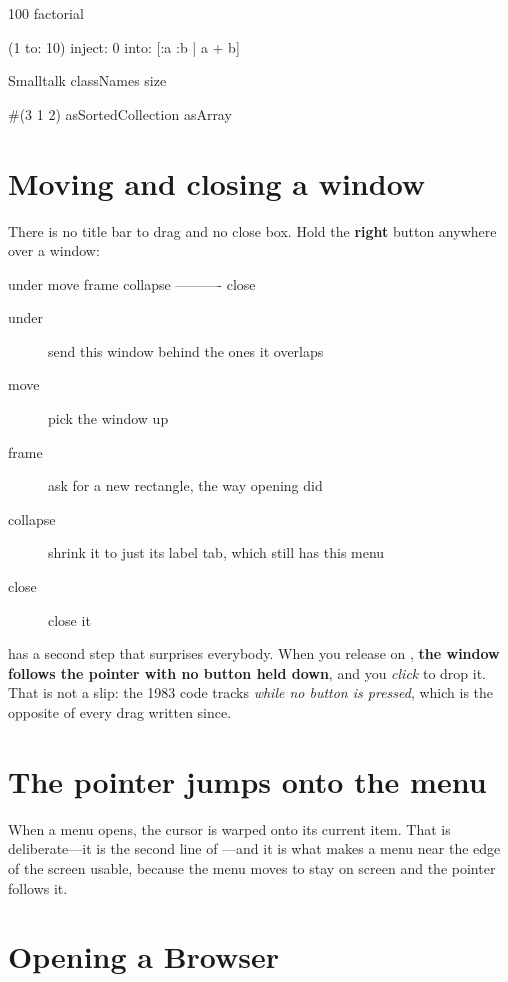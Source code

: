 \begin{st}
100 factorial

(1 to: 10) inject: 0 into: [:a :b | a + b]

Smalltalk classNames size

#(3 1 2) asSortedCollection asArray
\end{st}

\section{Moving and closing a window}

There is no title bar to drag and no close box. Hold the \textbf{right}
button anywhere over a window:

\begin{plain}
under
move
frame
collapse
----------
close
\end{plain}

\begin{description}
\item[under] send this window behind the ones it overlaps
\item[move] pick the window up
\item[frame] ask for a new rectangle, the way opening did
\item[collapse] shrink it to just its label tab, which still has this menu
\item[close] close it
\end{description}

 has a second step that surprises everybody. When you release on
, \textbf{the window follows the pointer with no button held down},
and you \emph{click} to drop it. That is not a slip: the 1983 code tracks
\emph{while no button is pressed}, which is the opposite of every drag written
since.

\section{The pointer jumps onto the menu}

When a menu opens, the cursor is warped onto its current item. That is
deliberate---it is the second line of ---and it is
what makes a menu near the edge of the screen usable, because the menu moves
to stay on screen and the pointer follows it.

\section{Opening a Browser}

